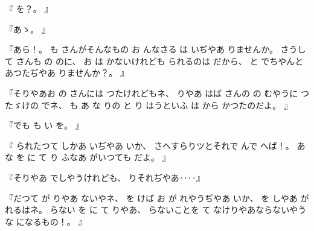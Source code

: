 %
『
を？。
』

%
『あゝ。
』

%
『あら！。
%
も
さんがそんなもの
お
んなさる
は
いぢやあ
りませんか。
%
さうして
さんも
の
のに、
%
お
は
かないけれども
られるのは
だから、
%
と
でちやんと
あつたぢやあ
りませんか？。
』

%
『そりやあお
の
さんには
つたけれどもネ、
%
りやあ
はば
さんの
の
むやうに
つたゞけの
でネ、
%
も
あ
な
りの
と
り
はうといふ
は
から
かつたのだよ。
』

%
『でも
も
い
を。
』

%
『
られたつて
しかあ
いぢやあ
いか、
%
さへすらりツとそれで
んで
へば！。
%
あ
な
を
に
て
り
ふなあ
がいつても
だよ。
』

%
『そりやあ
でしやうけれども、
%
りそれぢやあ‥‥』

%
『だつて
が
りやあ
ないやネ、
%
を
けば
お
が
れやうぢやあ
いか、
%
を
しやあ
が
れるはネ。
%
らない
を
に
て
りやあ、
%
らないことを
て
なけりやあならないやうな
になるもの！。
』

